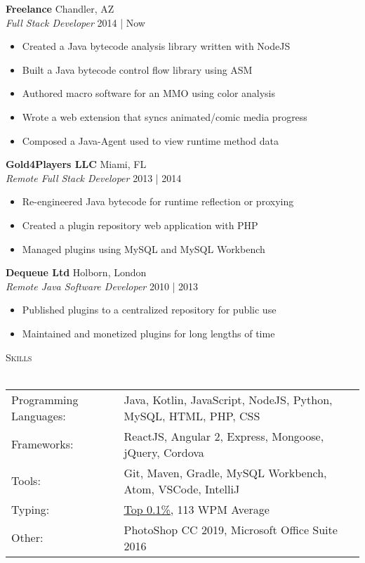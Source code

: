 \documentclass[a4paper]{article}
\newcommand{\lineunder} {
    \vspace*{-8pt} \\
    \hspace*{-18pt} \hrulefill \\
}
\newcommand{\header} [1] {
    {\hspace*{-18pt}\vspace*{6pt} \textsc{#1}}
    \vspace*{-6pt} \lineunder
}
\begin{document}
\textbf{Freelance} \hfill Chandler, AZ\\
\textit{Full Stack Developer} \hfill 2014 | Now\\
\vspace{-1mm}
\begin{itemize} \itemsep 1pt
	\item Created a Java bytecode analysis library written with NodeJS
	\item Built a Java bytecode control flow library using ASM
	\item Authored macro software for an MMO using color analysis
	\item Wrote a web extension that syncs animated/comic media progress
	\item Composed a Java-Agent used to view runtime method data
\end{itemize}
\textbf{Gold4Players LLC} \hfill Miami, FL\\
\textit{Remote Full Stack Developer} \hfill 2013 | 2014\\
\vspace{-1mm}
\begin{itemize} \itemsep 1pt
	\item Re-engineered Java bytecode for runtime reflection or proxying
	\item Created a plugin repository web application with PHP
	\item Managed plugins using MySQL and MySQL Workbench
\end{itemize}
\textbf{Dequeue Ltd} \hfill Holborn, London\\
\textit{Remote Java Software Developer} \hfill 2010 | 2013\\
\vspace{-1mm}
\begin{itemize} \itemsep 1pt
	\item Published plugins to a centralized repository for public use
	\item Maintained and monetized plugins for long lengths of time
\end{itemize}

\header{Skills}
\vspace{2mm}
\begin{tabular}{ l l }
	Programming Languages: & Java, Kotlin, JavaScript, NodeJS, Python, MySQL, HTML, PHP, CSS    \\
	Frameworks:            & ReactJS, Angular 2, Express, Mongoose, jQuery, Cordova
	\vspace{0.5mm}\\
	Tools:                 & Git, Maven, Gradle, MySQL Workbench, Atom, VSCode, IntelliJ
	\vspace{0.5mm}\\
	Typing:                & \href{https://data.typeracer.com/misc/badge?user=tsedlar}{\ul{Top 0.1\%}}, 113 WPM Average
	\vspace{0.5mm}\\
	Other:                 & PhotoShop CC 2019, Microsoft Office Suite 2016  \\
\end{tabular}
\vspace{2mm}
\end{document}
